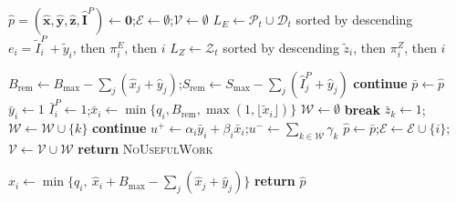 \documentclass[11pt]{article}
\begin{document}
\begin{algorithm}[htbp]
\caption{LP-Guided Construction of Whole Actions}
\label{alg:lp_extraction}
\begin{algorithmic}[1]
    \State $\hat p=(\hat{\mathbf x},\hat{\mathbf y},\hat{\mathbf z},\hat{\mathbf I}^P)\gets\mathbf 0$;\quad $\mathcal{E}\gets\emptyset$;\quad $\mathcal{V}\gets\emptyset$
    \State $L_E\gets\mathcal{P}_t\cup\mathcal{D}_t$ sorted by descending $e_i=\tilde I_i^P+\tilde y_i$, then $\pi_i^E$, then $i$
    \State $L_Z\gets\mathcal{Z}_t$ sorted by descending $\tilde z_i$, then $\pi_i^Z$, then $i$

    \State {}
        \State $B_{\mathrm{rem}}\gets B_{\max}-\sum_j(\hat x_j+\hat y_j)$;\quad $S_{\mathrm{rem}}\gets S_{\max}-\sum_j(\hat I_j^P+\hat y_j)$
            \State \textbf{continue}
        \EndIf
        \State $\bar p\gets\hat p$
            \State $\bar y_i\gets1$
        \Else
            \State $\bar I_i^P\gets1$;\quad $\bar x_i\gets\min\{q_i,B_{\mathrm{rem}},\max(1,\lfloor\tilde x_i\rfloor)\}$
        \EndIf
        \State $\mathcal{W}\gets\emptyset$
                \State \textbf{break}
            \EndIf
                \State $\bar z_k\gets1$;\quad $\mathcal{W}\gets\mathcal{W}\cup\{k\}$
            \EndIf
        \EndFor
            \State \textbf{continue} 
        \EndIf
        \State $u^+\gets\alpha_i\bar y_i+\beta_i\bar x_i$;\quad $u^-\gets\sum_{k\in\mathcal{W}}\gamma_k$
            \State $\hat p\gets\bar p$;\quad $\mathcal{E}\gets\mathcal{E}\cup\{i\}$;\quad $\mathcal{V}\gets\mathcal{V}\cup\mathcal{W}$
        \EndIf
    \EndFor
        \State \textbf{return} \textsc{NoUsefulWork}
    \EndIf

    \State {}
        \State $\hat x_i\gets\min\{q_i,\ \hat x_i+B_{\max}-\sum_j(\hat x_j+\hat y_j)\}$
    \EndFor
    \State \textbf{return} $\hat p$
\EndProcedure
\end{algorithmic}
\end{algorithm}
\end{document}
